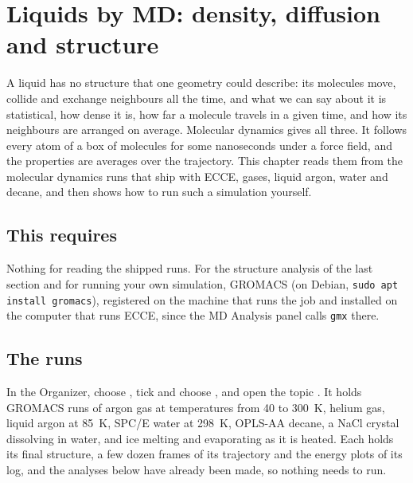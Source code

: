 \chapter{Liquids by MD: density, diffusion and structure}
\label{ch:liquids}

A liquid has no structure that one geometry could describe: its molecules move, collide and exchange neighbours all the time, and what we can say about it is statistical, how dense it is, how far a molecule travels in a given time, and how its neighbours are arranged on average. Molecular dynamics gives all three. It follows every atom of a box of molecules for some nanoseconds under a force field, and the properties are averages over the trajectory. This chapter reads them from the molecular dynamics runs that ship with ECCE, gases, liquid argon, water and decane, and then shows how to run such a simulation yourself.

\section*{This requires}
Nothing for reading the shipped runs. For the structure analysis of the last section and for running your own simulation, GROMACS (on Debian, \texttt{sudo apt install gromacs}), registered on the machine that runs the job and installed on the computer that runs ECCE, since the MD Analysis panel calls \texttt{gmx} there.

\section{The runs}
In the Organizer, choose , tick  and choose , and open the topic . It holds GROMACS runs of argon gas at temperatures from 40 to 300~K, helium gas, liquid argon at 85~K, SPC/E water at 298~K, OPLS-AA decane, a NaCl crystal dissolving in water, and ice melting and evaporating as it is heated. Each holds its final structure, a few dozen frames of its trajectory and the energy plots of its log, and the analyses below have already been made, so nothing needs to run.

